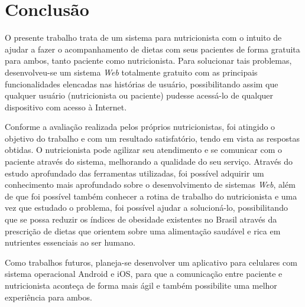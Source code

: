 \documentclass[
	12pt,				%
    oneside,			%
	a4paper,			%
	english,			%
	french,				%
	spanish,			%
	brazil,				%
	]{abntex2}
\begin{document}
\chapter{Conclusão}

O presente trabalho trata de um sistema para nutricionista com o intuito de ajudar a fazer o acompanhamento de dietas com seus pacientes de forma gratuita para ambos, tanto paciente como nutricionista. 
Para solucionar tais problemas, desenvolveu-se um sistema \textit{Web} totalmente gratuito com as
principais funcionalidades elencadas nas histórias de usuário, possibilitando assim
que qualquer usuário (nutricionista ou paciente) pudesse acessá-lo de qualquer
dispositivo com acesso à Internet.

Conforme a avaliação realizada pelos próprios nutricionistas, foi atingido o objetivo do trabalho e com um resultado satisfatório, tendo em vista as respostas obtidas. O nutricionista pode agilizar seu atendimento e se comunicar com o 
paciente através do sistema, melhorando a qualidade do seu serviço. Através do estudo aprofundado das ferramentas utilizadas, foi possível adquirir um conhecimento mais aprofundado sobre o desenvolvimento de sistemas \textit{Web}, além de que foi possível também conhecer a rotina de trabalho do nutricionista e uma vez que estudado o problema, foi possível ajudar a solucioná-lo, possibilitando que se possa reduzir os índices de obesidade existentes no Brasil através da prescrição de dietas que orientem sobre uma alimentação saudável e rica em nutrientes essenciais ao ser humano.

Como trabalhos futuros, planeja-se desenvolver um aplicativo para celulares com sistema operacional Android e iOS,
para que a comunicação entre paciente e nutricionista aconteça de forma mais ágil e também possibilite uma melhor
experiência para ambos.

\postextual



%
%
\end{document}

